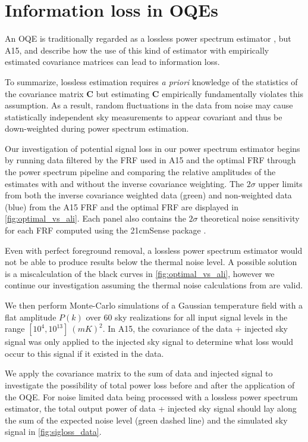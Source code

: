\documentclass[preprint2,hidelinks]{emulateapj}
\begin{document}
\section{Information loss in OQEs}\label{sec:sigloss}{
An OQE is traditionally regarded as a lossless power spectrum estimator \citep{tegmark1997}, but A15, \citet{dillon_et_al2015} and \citet{switzer_liu2014} describe how the use of this kind of estimator with empirically estimated covariance matrices can lead to information loss. 

To summarize, lossless estimation requires \emph{a priori} knowledge of the statistics of the covariance matrix $\mathbf{C}$ but estimating $\mathbf{C}$ empirically fundamentally violates this assumption.
As a result, random fluctuations in the data from noise may cause statistically independent sky measurements to appear covariant and thus be down-weighted during power spectrum estimation.


 Our investigation of potential signal loss in our power spectrum estimator begins by running data filtered by the FRF used in A15 and the optimal FRF through the power spectrum pipeline and comparing the relative amplitudes of the estimates with and without the inverse covariance weighting. The $2\sigma$ upper limits from both the inverse covariance weighted data (green) and non-weighted data (blue) from the A15 FRF and the optimal FRF are displayed in \autoref{fig:optimal_vs_ali}. Each panel also contains the $2\sigma$ theoretical noise sensitivity for each FRF computed using the 21cmSense package \citep{pober_et_al2013}. 
 
  Even with perfect foreground removal, a lossless power spectrum estimator would not be able to produce results below the thermal noise level. A possible solution is a miscalculation of the black curves in \autoref{fig:optimal_vs_ali}, however we continue our investigation assuming the thermal noise calculations from \citet{pober_et_al2013} are valid.
 
 We then perform Monte-Carlo simulations of a Gaussian temperature field with a flat amplitude $P(k)$ over 60 sky realizations for all input signal levels in the range $[10^{4},10^{13}]\ (mK)^{2}$. In A15, the covariance of the data + injected sky signal was only applied to the injected sky signal to determine what loss would occur to this signal if it existed in the data.
 
  We apply the covariance matrix to the sum of data and injected signal to investigate the possibility of total power loss before and after the application of the OQE. For noise limited data being processed with a lossless power spectrum estimator, the total output power of data + injected sky signal should lay along the sum of the expected noise level (green dashed line) and the simulated sky signal in \autoref{fig:sigloss_data}.
  
}
\end{document}
